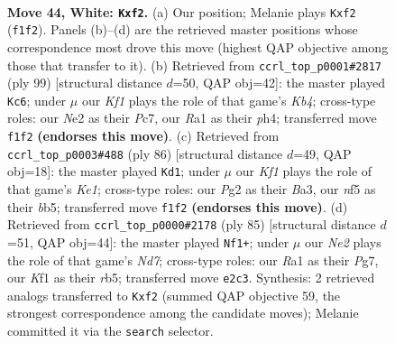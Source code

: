 \documentclass[11pt]{article}
\begin{document}
\clearpage

\begin{figure}[p]\centering
\begin{subfigure}{0.46\textwidth}\centering
\resizebox{\linewidth}{!}{%
\newchessgame
\chessboard[
  setfen={1r6/8/R2p1kp1/5n1p/1p2r2P/8/4NpP1/R4K2 w - - 1 44},
  showmover=false,
  pgfstyle=straightmove, color=movearrow, markmove={f1-f2}
]}
\caption{}
\end{subfigure}\hfill
\begin{subfigure}{0.46\textwidth}\centering
\resizebox{\linewidth}{!}{%
\newchessgame
\chessboard[
  setfen={3r4/2p2R2/8/1kP5/pr1PK1pP/8/3R2P1/8 b - - 5 50},
  showmover=false,
  pgfstyle=straightmove, color=movearrow, markmove={b5-c6}
]}
\caption{}
\end{subfigure}
\\[4pt]
\begin{subfigure}{0.46\textwidth}\centering
\resizebox{\linewidth}{!}{%
\newchessgame
\chessboard[
  setfen={8/7p/5pk1/1b2p3/4p3/B3P2P/1prN1P2/1R2K3 w - - 0 44},
  showmover=false,
  pgfstyle=straightmove, color=movearrow, markmove={e1-d1}
]}
\caption{}
\end{subfigure}\hfill
\begin{subfigure}{0.46\textwidth}\centering
\resizebox{\linewidth}{!}{%
\newchessgame
\chessboard[
  setfen={6k1/1p3rp1/8/pR6/8/P4P1P/1B1n1RPK/3r4 b - - 5 43},
  showmover=false,
  pgfstyle=straightmove, color=movearrow, markmove={d2-f1}
]}
\caption{}
\end{subfigure}
\caption{\textbf{Move 44, White: \texttt{Kxf2}.} (a) Our position; Melanie plays \texttt{Kxf2} (\texttt{f1f2}). Panels (b)--(d) are the retrieved master positions whose correspondence most drove this move (highest QAP objective among those that transfer to it). (b) Retrieved from \texttt{ccrl\_top\_p0001\#2817} (ply 99) [structural distance $d$=50, QAP obj=42]: the master played \texttt{Kc6}; under $\mu$ our \emph{Kf1} plays the role of that game's \emph{Kb4}; cross-type roles: our \emph{N}e2 as their \emph{P}c7, our \emph{R}a1 as their \emph{p}h4; transferred move \texttt{f1f2} \textbf{(endorses this move)}. (c) Retrieved from \texttt{ccrl\_top\_p0003\#488} (ply 86) [structural distance $d$=49, QAP obj=18]: the master played \texttt{Kd1}; under $\mu$ our \emph{Kf1} plays the role of that game's \emph{Ke1}; cross-type roles: our \emph{P}g2 as their \emph{B}a3, our \emph{n}f5 as their \emph{b}b5; transferred move \texttt{f1f2} \textbf{(endorses this move)}. (d) Retrieved from \texttt{ccrl\_top\_p0000\#2178} (ply 85) [structural distance $d$=51, QAP obj=44]: the master played \texttt{Nf1+}; under $\mu$ our \emph{Ne2} plays the role of that game's \emph{Nd7}; cross-type roles: our \emph{R}a1 as their \emph{P}g7, our \emph{K}f1 as their \emph{r}b5; transferred move \texttt{e2c3}. Synthesis: 2 retrieved analogs transferred to \texttt{Kxf2} (summed QAP objective 59, the strongest correspondence among the candidate moves); Melanie committed it via the \texttt{search} selector.}
\label{fig:thought-m86}
\end{figure}
\end{document}
